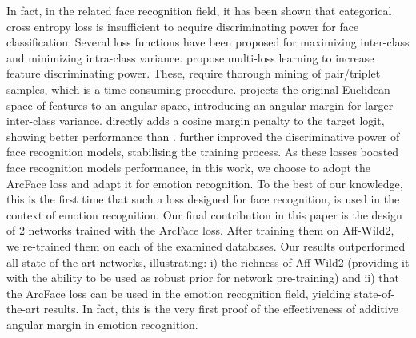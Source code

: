 \documentclass{bmvc2k}
\begin{document}
In fact, in the related face recognition field, it has been shown \cite{wen2016discriminative,liu2017sphereface} that categorical cross entropy loss is insufficient to acquire discriminating power for face classification. Several loss functions have been proposed for maximizing inter-class and minimizing intra-class variance. \cite{chopra2005learning,hoffer2015deep} propose multi-loss learning to increase
feature discriminating power. These, require thorough mining of pair/triplet samples, which is a time-consuming procedure. \cite{liu2017sphereface} projects the original Euclidean space of features to an angular space, introducing an angular margin for larger inter-class variance. \cite{wang2018cosface} directly adds a cosine margin penalty to the target logit, showing better performance than \cite{liu2017sphereface}. \cite{deng2018arcface} further improved the discriminative power of face recognition models, stabilising the training process. As these losses boosted face recognition models performance, in this work, we choose to adopt the ArcFace loss \cite{deng2018arcface} and adapt it for emotion recognition. To the best of our knowledge, this is the first time that such a loss designed for face recognition, is used in the context of emotion recognition. Our final contribution in this paper is the design of 2 networks trained with the ArcFace loss. After training them on Aff-Wild2, we re-trained them on each of the examined databases. Our results outperformed all state-of-the-art networks, illustrating: i) the richness of Aff-Wild2 (providing it with the ability to be used as robust prior for network pre-training) and ii) that the ArcFace loss can be used in the emotion recognition field, yielding state-of-the-art results. In fact, this is the very first proof of the effectiveness of additive angular margin in emotion recognition. 
\end{document}
